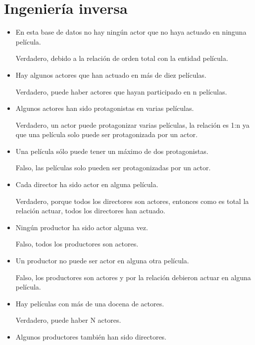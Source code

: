 \documentclass{article}
\begin{document}
\section{Ingeniería inversa}
\begin{itemize}
    \item En esta base de datos no hay ningún actor que no haya actuado en ninguna película.\par\null\par
    Verdadero, debido a la relación de orden total con la entidad película.
    \item Hay algunos actores que han actuado en más de diez películas.
    \par\null\par
    Verdadero, puede haber actores que hayan participado en n películas.
    \item Algunos actores han sido protagonistas en varias películas.
    \par\null\par Verdadero, un actor puede protagonizar varias películas, la relación es 1:n ya que una película solo puede ser protagonizada por un actor.
    \item Una película sólo puede tener un máximo de dos protagonistas.
    \par\null\par
    Falso, las películas solo pueden ser protagonizadas por un actor.
    \item Cada director ha sido actor en alguna película.
    \par\null\par
    Verdadero, porque todos los directores son actores, entonces como es total la relación actuar, todos los directores han actuado. 
    \item Ningún productor ha sido actor alguna vez.
    \par\null\par Falso, todos los productores son actores.
    \item Un productor no puede ser actor en alguna otra película.
    \par\null\par
    Falso, los productores son actores y por la relación debieron actuar en alguna película.
    \item Hay películas con más de una docena de actores.
    \par\null\par Verdadero, puede haber N actores.
    \item Algunos productores también han sido directores.

\end{itemize}
\end{document}

